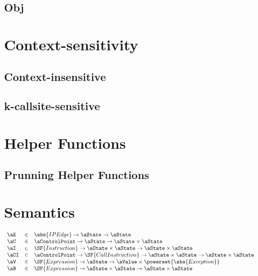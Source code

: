 \subsection{Obj}

\newpage
\section{Context-sensitivity}
\subsection{Context-insensitive}
\subsection{k-callsite-sensitive}

\newpage
\section{Helper Functions}

\subsection{Prunning Helper Functions}

\newpage
\section{Semantics}
\[
\begin{array}{lcl}
\aE & \in & \abs{IPEdge} \rightarrow \aState \rightarrow \aState \\
\aC & \in & \aControlPoint \rightarrow \aState \rightarrow \aState \times \aState\\
\aI & \in & \SF{Instruction} 
    \rightarrow \aState \times \aState \rightarrow \aState \times \aState\\
\aCI & \in & \aControlPoint \rightarrow \SF{CallInstruction} 
    \rightarrow \aState \times \aState \rightarrow \aState \times \aState\\
\aV & \in & \SF{Expression} \rightarrow \aState 
    \rightarrow \aValue \times \powerset{\abs{Exception}} \\
\aB & \in & \SF{Expression} \rightarrow \aState \times \aState 
    \rightarrow \aState \times \aState\\
\end{array}
\]

